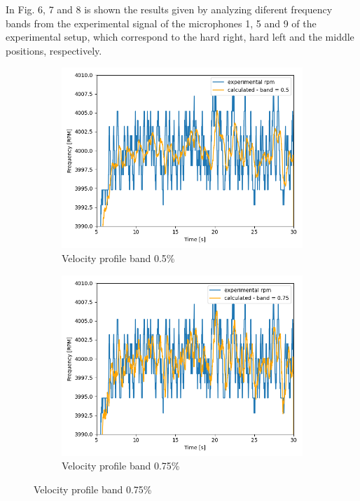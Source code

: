 \documentclass[10pt,fleqn,a4paper,twoside]{article}
\begin{document}
In Fig. 6, 7 and 8 is shown the results given by analyzing diferent frequency bands from the experimental signal of the microphones 1, 5 and 9 of the experimental setup, which correspond to the hard right, hard left and the middle positions, respectively. 
\newpage
\begin{figure}[H] 
    \centering
    \begin{subfigure}{0.4\textwidth}
        \includegraphics[width=\textwidth]{Figures/rpm_analysis_mic0_band_0.5.png}
        \caption{Velocity profile band 0.5\%}
        \label{fig:second}
    \end{subfigure}
    \hfill
    \centering
    \begin{subfigure}{0.4\textwidth}
        \includegraphics[width=\textwidth]{Figures/rpm_analysis_mic0_band_0.75.png}
        \caption{Velocity profile band 0.75\%}
        \label{fig:third}
    \end{subfigure}
    \centering
    \hfill
    

\end{figure}
\end{document}
